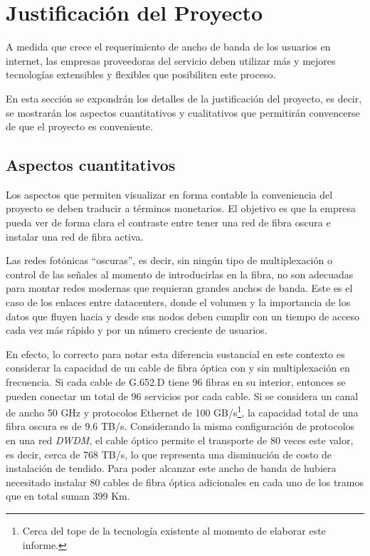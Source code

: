 \section{Justificaci\'on del Proyecto}\label{sec:justificacion}

A medida que crece el requerimiento de ancho de banda de los usuarios
en internet, las empresas proveedoras del servicio deben utilizar más
y mejores tecnologías extensibles y flexibles que posibiliten este
proceso.

En esta sección se expondrán los detalles de la justificación del
proyecto, es decir, se mostrarán los aspectos cuantitativos y
cualitativos que permitirán convencerse de que el proyecto es
conveniente.

\subsection{Aspectos cuantitativos}
\label{sec:cuantitativos}

Los aspectos que permiten visualizar en forma contable la conveniencia
del proyecto se deben traducir a términos monetarios. El objetivo es
que la empresa pueda ver de forma clara el contraste entre tener una
red de fibra oscura e instalar una red de fibra activa.

Las redes fotónicas ``oscuras'', es decir, sin ningún tipo de
multiplexación o control de las señales al momento de introducirlas en
la fibra, no son adecuadas para montar redes modernas que requieran
grandes anchos de banda. Este es el caso de los enlaces entre 
datacenters, donde el volumen y la importancia de los datos que fluyen
hacia y desde sus nodos deben cumplir con un tiempo de acceso cada vez
más rápido y por un número creciente de usuarios.

En efecto, lo correcto para notar esta diferencia sustancial en este
contexto es considerar la capacidad de un cable de fibra óptica con y
sin multiplexación en frecuencia. Si cada cable de G.652.D tiene 96
fibras en su interior, entonces se pueden conectar un total de 96
servicios por cada cable. Si se considera un canal de ancho 50 GHz y
protocolos Ethernet de 100 GB/s\footnote{Cerca del tope de la
  tecnología existente al momento de elaborar este informe.}, la
capacidad total de una fibra oscura es de 9.6 TB/s. Considerando la
misma configuración de protocolos en una red \emph{DWDM}, el cable
óptico permite el transporte de 80 veces este valor, es decir, cerca
de 768 TB/s, lo que representa una disminución de costo de instalación
de tendido. Para poder alcanzar este ancho de banda de hubiera
necesitado instalar 80 cables de fibra óptica adicionales en cada uno
de los tramos que en total suman 399 Km.


